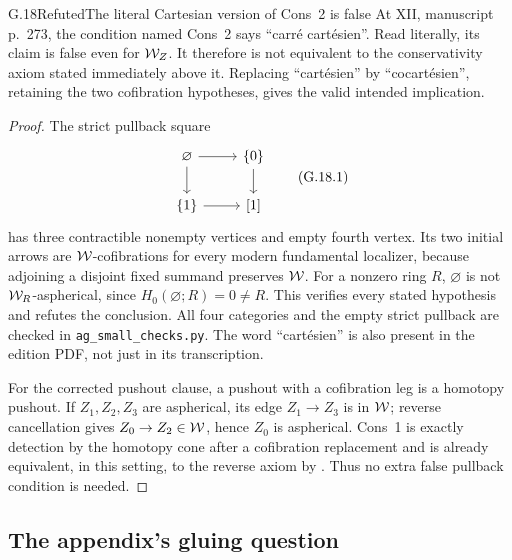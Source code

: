 \begin{claim}{G.18}{Refuted}{The literal Cartesian version of Cons~2 is false}
At XII, manuscript p.~273, the condition named Cons~2 says ``carr\'e cart\'esien''. Read literally, its claim is false even for $\mathcal{W}_Z$. It therefore is not equivalent to the conservativity axiom stated immediately above it. Replacing ``cart\'esien'' by ``cocart\'esien'', retaining the two cofibration hypotheses, gives the valid intended implication.
\end{claim}
\begin{proof}
The strict pullback square
\[
\begin{tikzcd}
\varnothing\ar[r]\ar[d]&\{0\}\ar[d]\\
\{1\}\ar[r]&{[1]}
\end{tikzcd}                                                    \tag{G.18.1}
\]
has three contractible nonempty vertices and empty fourth vertex. Its two initial arrows are $\mathcal{W}$-cofibrations for every modern fundamental localizer, because adjoining a disjoint fixed summand preserves $\mathcal{W}$. For a nonzero ring $R$, $\varnothing$ is not $\mathcal{W}_R$-aspherical, since $H_0(\varnothing;R)=0\ne R$. This verifies every stated hypothesis and refutes the conclusion. All four categories and the empty strict pullback are checked in \texttt{ag\_small\_checks.py}. The word ``cart\'esien'' is also present in the edition PDF, not just in its transcription.

For the corrected pushout clause, a pushout with a cofibration leg is a homotopy pushout. If $Z_1,Z_2,Z_3$ are aspherical, its edge $Z_1\to Z_3$ is in $\mathcal{W}$; reverse cancellation gives $Z_0\to Z_2\in\mathcal{W}$, hence $Z_0$ is aspherical. Cons~1 is exactly detection by the homotopy cone after a cofibration replacement and is already equivalent, in this setting, to the reverse axiom by . Thus no extra false pullback condition is needed.
\end{proof}

\subsection{The appendix's gluing question}

